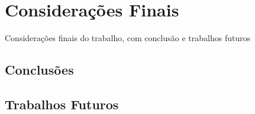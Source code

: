 \chapter{Considerações Finais}
\label{chap:conclusao}

Considerações finais do trabalho, com conclusão e trabalhos futuros

\section{Conclusões}

\section{Trabalhos Futuros}